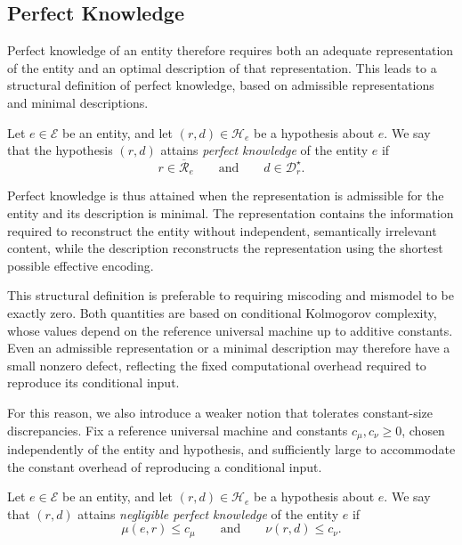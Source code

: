 %
%

\subsection*{Perfect Knowledge}
\label{sec:perfect_knowledge}

Perfect knowledge of an entity therefore requires both an adequate representation of the entity and an optimal description of that representation. This leads to a structural definition of perfect knowledge, based on admissible representations and minimal descriptions.

\begin{definition}
Let $e\in\mathcal{E}$ be an entity, and let $(r,d)\in\mathcal{H}_e$ be a hypothesis about $e$. We say that the hypothesis $(r,d)$ attains \emph{perfect knowledge} of the entity $e$ if
\[
r\in\overline{\mathcal{R}}_e \qquad\text{and}\qquad d\in\mathcal{D}_r^\star.
\]
\end{definition}

Perfect knowledge is thus attained when the representation is admissible for the entity and its description is minimal. The representation contains the information required to reconstruct the entity without independent, semantically irrelevant content, while the description reconstructs the representation using the shortest possible effective encoding.

This structural definition is preferable to requiring miscoding and mismodel to be exactly zero. Both quantities are based on conditional Kolmogorov complexity, whose values depend on the reference universal machine up to additive constants. Even an admissible representation or a minimal description may therefore have a small nonzero defect, reflecting the fixed computational overhead required to reproduce its conditional input.

For this reason, we also introduce a weaker notion that tolerates constant-size discrepancies. Fix a reference universal machine and constants $c_\mu,c_\nu \geq 0$, chosen independently of the entity and hypothesis, and sufficiently large to accommodate the constant overhead of reproducing a conditional input.

\begin{definition}
Let $e\in\mathcal{E}$ be an entity, and let $(r,d)\in\mathcal{H}_e$ be a hypothesis about $e$. We say that $(r,d)$ attains \emph{negligible perfect knowledge}  of the entity $e$ if
\[
\mu(e,r)\leq c_\mu \qquad\text{and}\qquad \nu(r,d)\leq c_\nu.
\]
\end{definition}

